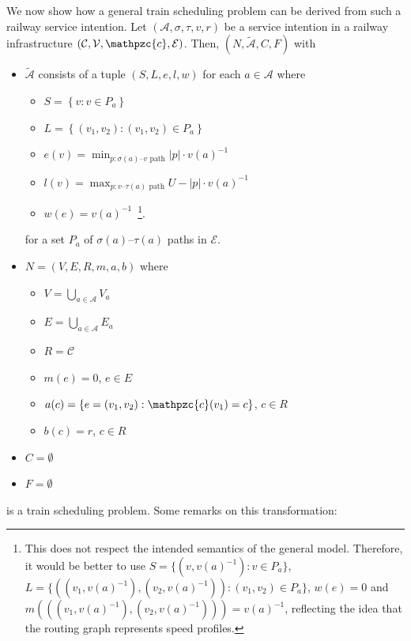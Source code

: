 \documentclass{article}
\begin{document}
We now show how a general train scheduling problem can be derived from such a railway service intention. Let $(\mathcal{A},\sigma,\tau,v,r)$ be a service intention in a railway infrastructure $(\mathcal{C}, \mathcal{V}, \mathpzc{c}, \mathcal{E})$.
Then, $(N,\tilde{\mathcal{A}},C,F)$ with
\begin{itemize}
    \item $\tilde{\mathcal{A}}$ consists of a tuple $(S,L,e,l,w)$ for each $a \in \mathcal{A}$ where
        \begin{itemize}
            \item $S=\left\{ v: v \in P_a\right\}$
            \item $L=\left\{ (v_1,v_2): (v_1,v_2) \in P_a\right\}$
            \item $e(v)=\min_{p: \sigma(a)\textrm{--}v\textrm{ path}} \left|p\right| \cdot {v(a)}^{-1}$
            \item $l(v)=\max_{p: v\textrm{--}\tau(a)\textrm{ path}} U-\left|p\right| \cdot {v(a)}^{-1}$
            \item $w(e)={v(a)}^{-1}$\mbox{  }\footnote{This does not respect the intended semantics of the general model. Therefore, it would be better to use $S=\{ (v,{v(a)}^{-1}): v \in P_a\}$, $L=\{ ((v_1,{v(a)}^{-1}),(v_2,{v(a)}^{-1})): (v_1,v_2) \in P_a\}$, $w(e)=0$ and $m(((v_1,{v(a)}^{-1}),(v_2,{v(a)}^{-1})))={v(a)}^{-1}$, reflecting the idea that the routing graph represents speed profiles.}.
        \end{itemize}
        for a set $P_a$ of $\sigma(a)$--$\tau(a)$ paths in $\mathcal{E}$.
        \item $N=(V,E,R,m,a,b)$ where
        \begin{itemize}
            \item $V=\bigcup_{a \in \mathcal{A}} V_a$
            \item $E=\bigcup_{a \in \mathcal{A}} E_a$
            \item $R=\mathcal{C}$
            \item $m(e)=0$, $e \in E$
            \item $a(c) = \left\{ e=(v_1,v_2): \mathpzc{c}(v_1)=c \right\}$, $c\in R$
            \item $b(c)=r$, $c\in R$
        \end{itemize}
    \item $C=\emptyset$
    \item $F=\emptyset$
\end{itemize}
is a train scheduling problem. Some remarks on this transformation:
\end{document}

